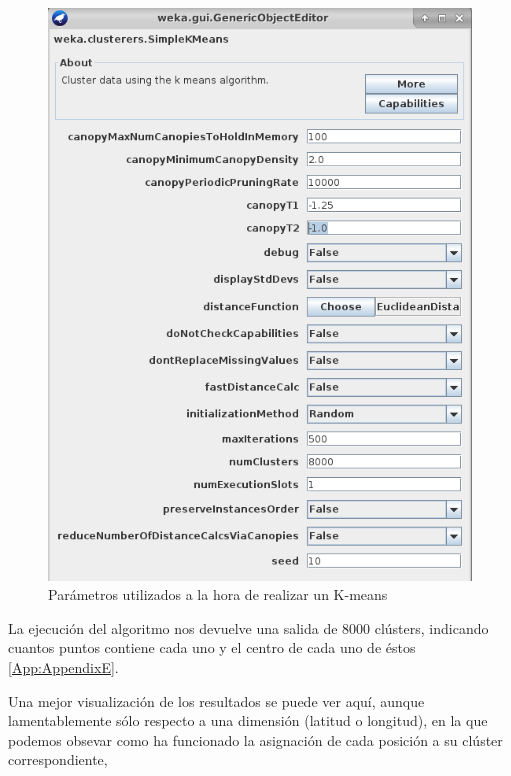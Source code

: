 \documentclass[a4paper, 12pt]{article}
\begin{document}
\begin{figure}[!htbp]
	\begin{center}
	\includegraphics[scale=.5]{wekaKMeansParameters.png}
	\end{center}
	\caption{Par\'ametros utilizados a la hora de realizar un K-means}
\end{figure}

La ejecuci\'on del algoritmo nos devuelve una salida de 8000 cl\'usters, indicando cuantos puntos contiene cada uno y el centro de cada uno de \'estos \ref{App:AppendixE}.

Una mejor visualizaci\'on de los resultados se puede ver aqu\'i, aunque lamentablemente s\'olo respecto a una dimensi\'on (latitud o longitud), en la que podemos obsevar como ha funcionado la asignaci\'on de cada posici\'on a su cl\'uster correspondiente,
\end{document}
